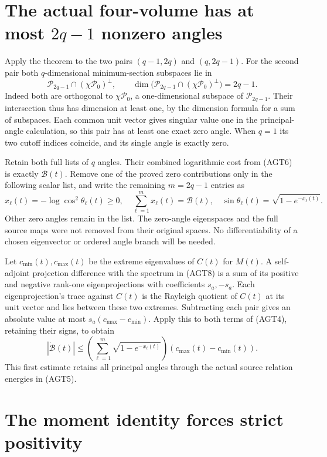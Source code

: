 \documentclass[11pt]{article}
\newcommand{\cP}{\mathcal P}
\begin{document}
\section{The actual four-volume has at most $2q-1$ nonzero angles}

Apply the theorem to the two pairs $(q-1,2q)$ and $(q,2q-1)$.
For the second pair both $q$-dimensional minimum-section
subspaces lie in
\[
 \cP_{2q-1}\cap(\chi\cP_0)^\perp,
 \qquad\dim\bigl(\cP_{2q-1}\cap(\chi\cP_0)^\perp\bigr)=2q-1.
 \tag{AGT9}
\]
Indeed both are orthogonal to $\chi\cP_0$, a one-dimensional
subspace of $\cP_{2q-1}$. Their intersection thus has dimension
at least one, by the dimension formula for a sum of subspaces.
Each common unit vector gives singular value one in the
principal-angle calculation, so this pair has at least one
exact zero angle. When $q=1$ its two cutoff indices coincide,
and its single angle is exactly zero.

Retain both full lists of $q$ angles. Their combined logarithmic
cost from (AGT6) is exactly $\mathcal B(t)$. Remove one of the
proved zero contributions only in the following scalar list,
and write the remaining $m=2q-1$ entries as
\[
 x_\ell(t)=-\log\cos^2\theta_\ell(t)\ge0,
 \quad\sum_{\ell=1}^{m}x_\ell(t)=\mathcal B(t),
 \quad\sin\theta_\ell(t)=\sqrt{1-e^{-x_\ell(t)}}.
 \tag{AGT10}
\]
Other zero angles remain in the list. The zero-angle eigenspaces
and the full source maps were not removed from their original
spaces. No differentiability of a chosen eigenvector or ordered
angle branch will be needed.

Let $c_{\min}(t),c_{\max}(t)$ be the extreme eigenvalues of
$C(t)$ for $M(t)$. A self-adjoint projection difference with
the spectrum in (AGT8) is a sum of its positive and negative
rank-one eigenprojections with coefficients $s_a,-s_a$.
Each eigenprojection's trace against $C(t)$ is the Rayleigh
quotient of $C(t)$ at its unit vector and lies between these
two extremes. Subtracting each pair gives an absolute value
at most $s_a(c_{\max}-c_{\min})$. Apply this to both terms
of (AGT4), retaining their signs, to obtain
\[
 |\dot{\mathcal B}(t)|
 \le\left(\sum_{\ell=1}^{m}\sqrt{1-e^{-x_\ell(t)}}\right)
                       (c_{\max}(t)-c_{\min}(t)).
 \tag{AGT11}
\]
This first estimate retains all principal angles through the
actual source relation energies in (AGT5).

\section{The moment identity forces strict positivity}
\end{document}
